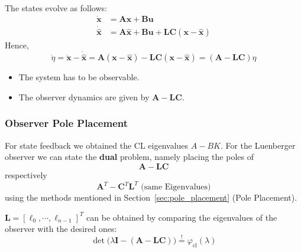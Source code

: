 The states evolve as follows:
\begin{align*}
    \dot{\mathbf{x}}       & =\mathbf{Ax}+\mathbf{Bu}                                                         \\
    \dot{\hat{\mathbf{x}}} & =\mathbf{A}\hat{\mathbf{x}}+\mathbf{Bu}+\mathbf{LC}(\mathbf{x}-\hat{\mathbf{x}})
\end{align*}
Hence,
\begin{equation*}
    \dot{\eta}=\dot{\mathbf{x}}-\dot{\hat{\mathbf{x}}}=\mathbf{A}(\mathbf{x}-\hat{\mathbf{x}})-\mathbf{LC}(\mathbf{x}-\hat{\mathbf{x}})=(\mathbf{A}-\mathbf{LC})\eta
\end{equation*}


\begin{itemize}
    \item The system has to be observable.
    \item The observer dynamics are given by $\mathbf{A}-\mathbf{LC}$.
\end{itemize}

\subsubsection{Observer Pole Placement}
For state feedback we obtained the CL eigenvalues $A-BK$.
For the Luenberger observer we can state the \textbf{dual} problem, namely placing the poles of
\begin{equation*}
    \mathbf{A}-\mathbf{LC}
\end{equation*}
respectively
\begin{equation*}
    \mathbf{A}^T-\mathbf{C}^T \mathbf{L}^T\text{ (same Eigenvalues)}
\end{equation*}
using the methods mentioned in Section\ \ref{sec:pole_placement} (Pole Placement).


$\mathbf{L}={\left[\ell_0,\cdots,\ell_{n-1}\right]}^T$ can be obtained by comparing the eigenvalues of the observer with the desired ones:
\noindent\begin{equation*}
    \det\bigl(\lambda \mathbf{I} -(\mathbf{A}-\mathbf{LC})\bigr) \overset{!}{=} \varphi_{\mathrm{cl}}(\lambda)
\end{equation*}



